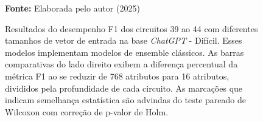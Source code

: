 \begin{figure}
\caption{Resultados do desempenho F1 dos circuitos 39 ao 44 com diferentes tamanhos de vetor de entrada na base \textit{ChatGPT} - Difícil. Esses modelos implementam modelos de ensemble clássicos. As barras comparativas do lado direito exibem a diferença percentual da métrica F1 ao se reduzir de 768 atributos para 16 atributos, divididos pela profundidade de cada circuito. As marcações que indicam semelhança estatística são advindas do teste pareado de Wilcoxon com correção de p-valor de Holm.}
\label{fig:n_features:hard:g8}
     \centering
    \centering
      \par\medskip\ABNTEXfontereduzida\selectfont\textbf{Fonte:} Elaborada pelo autor (2025) \par\medskip
\end{figure}